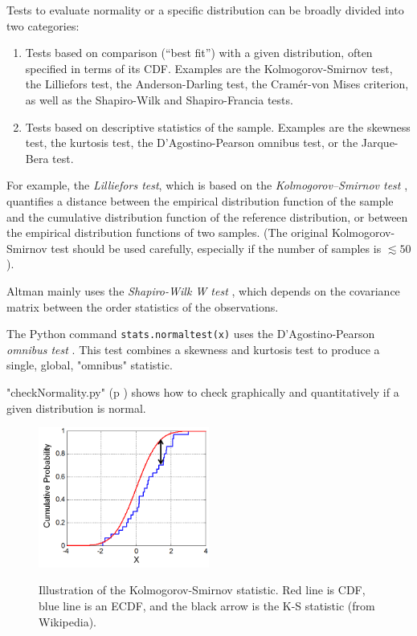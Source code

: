 Tests to evaluate normality or a specific distribution can be broadly divided into two categories:

\begin{enumerate}
  \item Tests based on comparison (“best fit”) with a given distribution, often specified in terms of its CDF. Examples are the Kolmogorov-Smirnov test, the Lilliefors test, the Anderson-Darling test, the Cramér-von Mises criterion, as well as the Shapiro-Wilk and Shapiro-Francia tests.
  \item Tests based on descriptive statistics of the sample. Examples are the skewness test, the kurtosis test, the D’Agostino-Pearson omnibus test, or the Jarque-Bera test.
\end{enumerate}
    

For example, the \emph{Lilliefors test}, which is based on the \emph{Kolmogorov--Smirnov test} , quantifies a distance between the empirical distribution function of the sample and the cumulative distribution function of the reference distribution, or between the empirical distribution functions of two samples. (The original Kolmogorov-Smirnov test should be used carefully, especially if the number of samples is $\lesssim50$).

Altman mainly uses the \emph{Shapiro-Wilk W test} \cite{altman99}, which depends on the covariance matrix between the order statistics of the observations.

The Python command \lstinline{stats.normaltest(x)} uses the D’Agostino-Pearson \emph{omnibus test} . This test combines a skewness and kurtosis test to produce a single, global, "omnibus" statistic.


\PyImg "checkNormality.py" (p \pageref{py:checkNormality}) shows how to check graphically and quantitatively if a given distribution is normal.

\begin{figure}
  \centering
  \includegraphics[width=0.5\textwidth]{../Images/KS_Example.png}\\
  \caption{Illustration of the Kolmogorov-Smirnov statistic. Red line is CDF, blue line is an ECDF, and the black arrow is the K-S statistic (from Wikipedia).}\label{fig:ksplot}
\end{figure}


